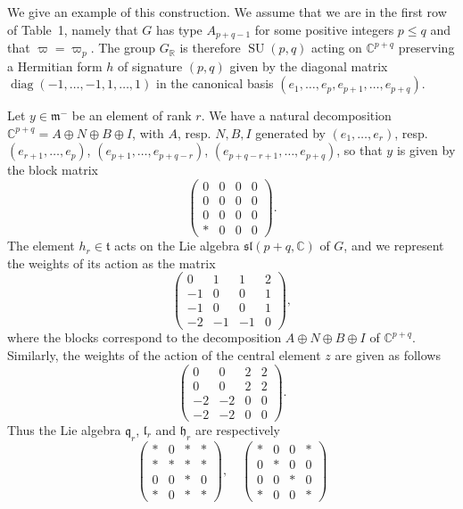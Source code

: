 \begin{example}
We give an example of this construction. We assume that we are in the first row of Table~1, namely that $G$ has type $A_{p+q-1}$ for some positive integers $p\leqslant q$ and that $\varpi=\varpi_p$. The group $G_{\mathbb R}$ is therefore $\operatorname{SU}(p,q)$ acting on $\mathbb C^{p+q}$ preserving a Hermitian form $h$ of signature $(p,q)$ given by the diagonal matrix $\operatorname{diag}(-1,\ldots,-1,1,\ldots,1)$ in the canonical basis $(e_1,\ldots,e_p,e_{p+1},\ldots,e_{p+q})$.

Let $y\in\mathfrak m^-$ be an element of rank $r$. We have a natural decomposition $\mathbb C^{p+q}=A\oplus N\oplus B\oplus I$, with $A$, resp. $N,B,I$ generated by $(e_1,\ldots,e_r)$, resp. $(e_{r+1},\ldots,e_p)$, $(e_{p+1},\ldots,e_{p+q-r})$, $(e_{p+q-r+1},\ldots,e_{p+q})$, so that $y$ is given by the block matrix
\[
\begin{pmatrix}0&0&0&0\\0&0&0&0\\0&0&0&0\\ *&0&0&0\end{pmatrix}.
\]
The element $h_r\in\mathfrak t$ acts on the Lie algebra $\mathfrak{sl}(p+q,\mathbb C)$ of $G$, and we represent the weights of its action as the matrix
\[
\begin{pmatrix}0&1&1&2\\-1&0&0&1\\-1&0&0&1\\-2&-1&-1&0\end{pmatrix},
\]
where the blocks correspond to the decomposition $A\oplus N\oplus B\oplus I$ of $\mathbb C^{p+q}$. Similarly, the weights of the action of the central element $z$ are given as follows
\[
\begin{pmatrix}0&0&2&2\\0&0&2&2\\-2&-2&0&0\\-2&-2&0&0\end{pmatrix}.
\]
Thus the Lie algebra $\mathfrak q_r$, $\mathfrak l_r$ and $\mathfrak h_r$ are respectively
\[
\begin{pmatrix}*&0&*&*\\{*}&*&*&*\\0&0&*&0\\{*}&0&*&*\end{pmatrix},\quad
\begin{pmatrix}*&0&0&*\\0&*&0&0\\0&0&*&0\\{*}&0&0&*\end{pmatrix}
\]
\end{example}
